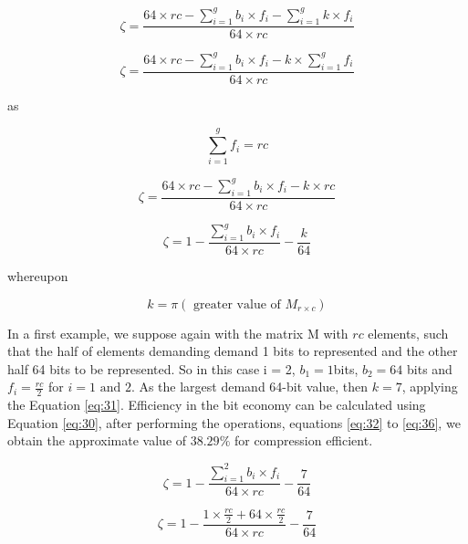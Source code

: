 \documentclass[10pt]{article}
\begin{document}
\begin{equation} \label{eq:26}
 \zeta = \frac{64 \times rc - \sum_{i=1}^{g}  b_i \times f_i  -\sum_{i=1}^{g}  k \times f_i }{64 \times rc} 
\end{equation}

\begin{equation} \label{eq:27}
 \zeta = \frac{64 \times rc - \sum_{i=1}^{g}  b_i \times f_i  - k \times\sum_{i=1}^{g}  f_i }{64 \times rc} 
\end{equation}

\noindent as

\begin{equation} \label{eq:28}
 \sum_{i=1}^{g} f_i = rc
\end{equation}

\begin{equation} \label{eq:29}
 \zeta = \frac{64 \times rc - \sum_{i=1}^{g}  b_i \times f_i  - k \times rc }{64 \times rc} 
\end{equation}

\begin{equation}\label{eq:30}
 \zeta = 1 - \frac{\sum_{i=1}^{g}  b_i \times f_i }{64 \times rc} - \frac{k}{64} 
\end{equation}

\noindent whereupon

\begin{equation} \label{eq:31}
 k = \pi(\text{ greater value of }M_{r \times c})
\end{equation}

In a first example, we suppose again with the matrix M with $rc$ elements, such that the half of elements demanding demand 1 bits to represented and the other half 64 bits to be represented. So in this case i = 2, $b_1=1 $bits, $b_2=64$ bits and $f_i = \frac{rc}{2}$ for $i = 1 \text{ and } 2$. As the largest demand 64-bit value, then $k=7$, applying the Equation \ref{eq:31}. Efficiency in the bit economy can be calculated using Equation \ref{eq:30}, after performing the operations, equations \ref{eq:32} to \ref{eq:36}, we obtain the approximate value of $38.29\%$ for compression efficient.

\begin{equation} \label{eq:32}
 \zeta = 1 - \frac{\sum_{i=1}^{2}  b_i \times f_i }{64 \times rc} - \frac{7}{64} 
\end{equation}

\begin{equation} \label{eq:33}
 \zeta = 1 - \frac{  1 \times \frac{rc}{2} + 64 \times \frac{rc}{2} }{64 \times rc} - \frac{7}{64} 
\end{equation}
\end{document}
